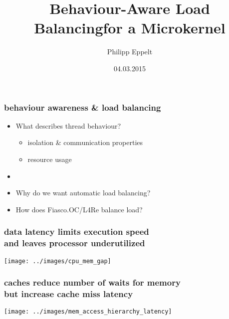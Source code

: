 \documentclass[utf8,10pt,aspectratio=169]{beamer}
\title[]{Behaviour-Aware Load Balancing\newline for a Microkernel}
\author{Philipp Eppelt}
\date{04.03.2015}
\begin{document}
\maketitle

\large

\newcommand{\ft}[1]{\frametitle{\hfill #1}}


\begin{frame}
  \frametitle{behaviour awareness \& load balancing}
  \centering
  \begin{itemize}
  \setlength{\itemsep}{6pt}
    \item What describes thread behaviour?
    \begin{itemize}
      \item isolation \& communication properties
      \item resource usage
    \end{itemize}
    \item
    \item Why do we want automatic load balancing?
    \item How does Fiasco.OC/L4Re balance load?
  \end{itemize}

\end{frame}

\begin{frame}
  \frametitle{data latency limits execution speed\\ and leaves processor
  underutilized}
  \centering
  \texttt{[image: ../images/cpu\_mem\_gap]}
\end{frame}


\begin{frame}
  \frametitle{caches reduce number of waits for memory\\ but increase cache
  miss latency}
  \centering
  \texttt{[image: ../images/mem\_access\_hierarchy\_latency]}
\end{frame}
\end{document}
